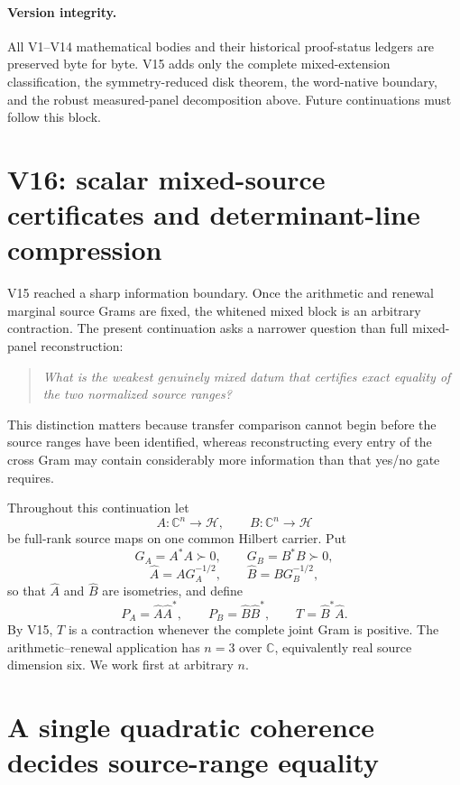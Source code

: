\documentclass[11pt]{article}
\theoremstyle{definition}
\theoremstyle{remark}
\begin{document}
\paragraph{Version integrity.}
All V1--V14 mathematical bodies and their historical proof-status ledgers are
preserved byte for byte.  V15 adds only the complete mixed-extension
classification, the symmetry-reduced disk theorem, the word-native boundary,
and the robust measured-panel decomposition above.  Future continuations must
follow this block.

\section{V16: scalar mixed-source certificates and determinant-line compression}
\label{sec:v16-context}

V15 reached a sharp information boundary.  Once the arithmetic and renewal
marginal source Grams are fixed, the whitened mixed block is an arbitrary
contraction.  The present continuation asks a narrower question than full
mixed-panel reconstruction:
\begin{quote}
\emph{What is the weakest genuinely mixed datum that certifies exact equality
of the two normalized source ranges?}
\end{quote}
This distinction matters because transfer comparison cannot begin before the
source ranges have been identified, whereas reconstructing every entry of the
cross Gram may contain considerably more information than that yes/no gate
requires.

Throughout this continuation let
\[
 A:\mathbb C^n\to\mathcal H,
 \qquad
 B:\mathbb C^n\to\mathcal H
\]
be full-rank source maps on one common Hilbert carrier.  Put
\[
 G_A=A^*A\succ0,
 \qquad
 G_B=B^*B\succ0,
\]
\[
 \widehat A=A G_A^{-1/2},
 \qquad
 \widehat B=B G_B^{-1/2},
\]
so that $\widehat A$ and $\widehat B$ are isometries, and define
\[
 P_A=\widehat A\widehat A^*,
 \qquad
 P_B=\widehat B\widehat B^*,
 \qquad
 T=\widehat B^*\widehat A.
\]
By V15, $T$ is a contraction whenever the complete joint Gram is positive.
The arithmetic--renewal application has $n=3$ over $\mathbb C$, equivalently
real source dimension six.  We work first at arbitrary $n$.

\section{A single quadratic coherence decides source-range equality}
\label{sec:v16-quadratic}
\end{document}
